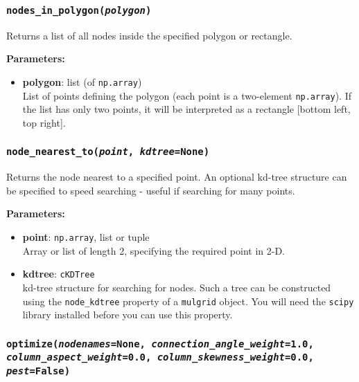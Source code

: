 \begin{snugshade}\subsubsection{\texttt{nodes\_in\_polygon(\emph{polygon})}}\end{snugshade}
\label{sec:mulgrid:nodes_in_polygon}

Returns a list of all nodes inside the specified polygon or rectangle.

\textbf{Parameters:}
\begin{itemize}
\item \textbf{polygon}: list (of \texttt{np.array})\\
  List of points defining the polygon (each point is a two-element \texttt{np.array}).  If the list has only two points, it will be interpreted as a rectangle [bottom left, top right].
\end{itemize}

\begin{snugshade}\subsubsection{\texttt{node\_nearest\_to(\emph{point}, \emph{kdtree}=None)}}\end{snugshade}
\label{sec:mulgrid:node_nearest_to}

Returns the node nearest to a specified point.  An optional kd-tree structure can be specified to speed searching - useful if searching for many points.

\textbf{Parameters:}
\begin{itemize}
\item \textbf{point}:  \texttt{np.array}, list or tuple\\
  Array or list of length 2, specifying the required point in 2-D.
\item \textbf{kdtree}:  \texttt{cKDTree}\\
  kd-tree structure for searching for nodes.  Such a tree can be constructed using the \texttt{node\_kdtree} property of a \texttt{mulgrid} object.  You will need the \texttt{scipy} library installed before you can use this property.
\end{itemize}

\begin{snugshade}
\subsubsection{\texttt{optimize(\emph{nodenames}=None, \emph{connection\_angle\_weight}=1.0,\\
    \emph{column\_aspect\_weight}=0.0, \emph{column\_skewness\_weight}=0.0, \emph{pest}=False)}}\end{snugshade}
\label{sec:mulgrid:optimize}

